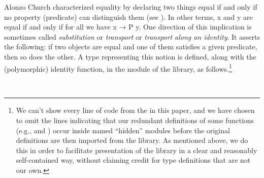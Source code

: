 Alonzo Church characterized equality by declaring two things equal if and only if no property (predicate) can distinguish them (see \cite{Church:1940}). In other terms, \ab x and \ab y are equal if and only if for all  we have  \ab x \as → \ab P \ab y. One direction of this implication is sometimes called \emph{substitution} or \emph{transport} or \emph{transport along an identity}. It asserts the following: if two objects are equal and one of them satisfies a given predicate, then so does the other. A type representing this notion is defined, along with the (polymorphic) identity function, in the  module of the \typetopology library, as follows.\footnote{We can't show every line of code from the \ualib in this paper, and we have chosen to omit the lines indicating that our redundant definitions of some functions (e.g.,  and ) occur inside named ``hidden'' modules before the original definitions are then imported from the \typetopology library. As mentioned above, we do this in order to facilitate presentation of the \ualib library in a clear and reasonably self-contained way, without claiming credit for type definitions that are not our own.}
\ccpad
\begin{code}%
\>[1]\AgdaSpace{}%
\AgdaSymbol{:}\AgdaSpace{}%
\AgdaSymbol{\{}\AgdaSpace{}%
\AgdaSymbol{:}\AgdaSpace{}%
\AgdaSymbol{\}}\AgdaSpace{}%
\AgdaSymbol{(}\AgdaSpace{}%
\AgdaSymbol{:}\AgdaSpace{}%
\AgdaSpace{}%
\AgdaSpace{}%
\AgdaSymbol{)}\AgdaSpace{}%
\AgdaSpace{}%
\AgdaSpace{}%
\AgdaSpace{}%
\<%
\\
%
\>[1]\AgdaSpace{}%
\AgdaSpace{}%
\AgdaSymbol{=}\AgdaSpace{}%
\AgdaSpace{}%
\AgdaSpace{}%
\AgdaSpace{}%
\<%
\end{code}
\scpad

